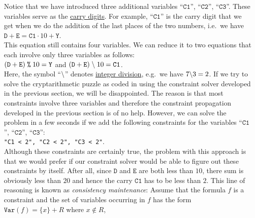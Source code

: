 Notice that we have introduced three additional variables ``$\mathtt{C1}$'', ``$\mathtt{C2}$'', ``$\mathtt{C3}$''. 
These variables serve as the \href{https://en.wikipedia.org/wiki/Carry_(arithmetic)}{carry digits}.  For
example, ``$\mathtt{C1}$'' is the carry digit that we get when we do the addition of the last places of the two
numbers, i.e.~we have
\\[0.2cm]
\hspace*{1.3cm}
$\mathtt{D} + \mathtt{E} = \mathtt{C1} \cdot 10 + \mathtt{Y}$.
\\[0.2cm]
This equation still contains four variables.  We can reduce it to two equations that each involve only three
variables as follows:
\\[0.2cm]
\hspace*{1.3cm}
$(\mathtt{D} + \mathtt{E})\; \texttt{\symbol{37}}\; 10 = \mathtt{Y}$ \quad and \quad
$(\mathtt{D} + \mathtt{E}) \;\mathtt{\symbol{92}}\; 10 = \mathtt{C1}$.
\\[0.2cm]
Here, the symbol ``$\mathtt{\symbol{92}}$'' denotes 
\href{https://en.wikipedia.org/wiki/Division_(mathematics)#Of_integers}{integer division}, e.g.~we have $7 \mathtt{\symbol{92}} 3 = 2$.
If we try to solve the cryptarithmetic puzzle as coded in  using the
constraint solver developed in the previous section, we will be disappointed.  The reason is that most
constraints involve three variables and therefore the constraint propagation developed in the previous section
is of no help.  However, we can solve the problem in a few seconds if we add the following constraints for the
variables ``$\mathtt{C1}$'', ``$\mathtt{C2}$'', ``$\mathtt{C3}$'':
\\[0.2cm]
\hspace*{1.3cm}
\texttt{"C1 < 2", "C2 < 2", "C3 < 2"}.
\\[0.2cm]
Although these constraints are certainly true, the problem with this approach is that we would prefer if our
constraint solver would be able to figure out these constraints by itself.  After all, since $\mathtt{D}$ and
$\mathtt{E}$ are both less than $10$, there sum is obviously less than $20$ and hence the carry $\mathtt{C1}$
has to be less than $2$.  This line of reasoning is known as \emph{\color{blue}consistency maintenance}:
Assume that the formula $f$ is a constraint and the set of variables occurring in $f$ has the form
\\[0.2cm]
\hspace*{1.3cm}
$\mathtt{Var}(f) = \{ x \} + R$ \quad where $x \not\in R$,
\\[0.2cm]
